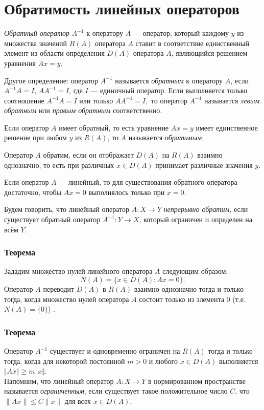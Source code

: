 \section{Обратимость линейных операторов}
\textit{Обратный оператор} $A^{-1}$ к оператору $A$ --- оператор, который каждому $y$ из множества значений $R(A)$ оператора $A$ ставит в соответствие единственный элемент из области определения $D(A)$ оператора $A$, являющийся решением уравнения $Ax = y$.

Другое определение: оператор $A^{-1}$ называется \textit{обратным} к оператору $A$, если ${\displaystyle A^{-1}A=I,\,AA^{-1}=I}$, где $I$ --- единичный оператор. Если выполняется только соотношение ${\displaystyle A^{-1}A=I}$ или только ${\displaystyle AA^{-1}=I,}$ то оператор $A^{-1}$ называется \textit{левым обратным} или \textit{правым обратным} соответственно.

Если оператор $A$ имеет обратный, то есть уравнение ${\displaystyle Ax=y}$ имеет единственное решение при любом $y$ из $R(A)$, то $A$ называется \textit{обратимым}.

Оператор $A$ обратим, если он отображает ${\displaystyle D(A)}$ на ${\displaystyle R(A)}$ взаимно однозначно, то есть при различных ${\displaystyle x\in D(A)}$ принимает различные значения $y$.

Если оператор $A$ --- линейный, то для существования обратного оператора достаточно, чтобы $A x = 0$ выполнялось только при $x = 0$.

Будем говорить, что линейный оператор $A:X\rightarrow Y$ \textit{непрерывно обратим}, если существует обратный оператор $A^{-1} : Y \rightarrow X$, который ограничен и определен на всём $Y$.

\subsubsection*{Теорема}
Зададим множество нулей линейного оператора $A$ следующим образом:
$$N(A)=\{x \in D(A) : Ax=0\}.$$
Оператор $A$ переводит $D(A)$ в $R(A)$ взаимно однозначно тогда и только тогда, когда множество нулей оператора $A$ состоит только из элемента $0$ (т.е. $N(A) = \{0\}$) \cite[с.~127]{trenogin}.

\subsubsection*{Теорема}
Оператор $A^{-1}$ существует и одновременно ограничен на $R(A)$ тогда и только тогда, когда для некоторой постоянной $m > 0$ и любого $x \in D(A)$ выполняется $\Vert Ax \Vert \geqslant m \Vert x \Vert$\cite[с.~127]{trenogin}.\\
Напомним, что линейный оператор $A:X\to Y$ в нормированном пространстве называется \textit{ограниченным}, если существует такое положительное число $C$, что $\|Ax\| \leqslant C\|x\|$ для всех $x \in D(A)$.

